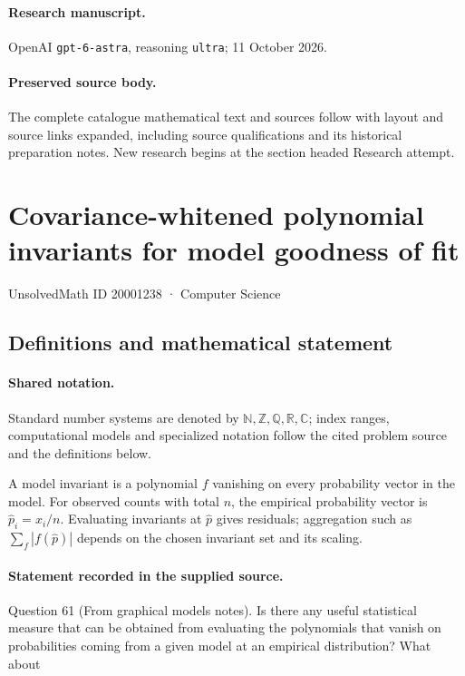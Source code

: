 \documentclass[11pt]{article}
\begin{document}
\paragraph{Research manuscript.} OpenAI \texttt{gpt-6-astra}, reasoning \texttt{ultra}; 11 October 2026.
\paragraph{Preserved source body.} The complete catalogue mathematical text and sources follow with layout and source links expanded, including source qualifications and its historical preparation notes. New research begins at the section headed Research attempt.

\section{Covariance-whitened polynomial invariants for model goodness of fit}\label{20001238}
{\small UnsolvedMath ID 20001238 · Computer Science}
\subsection{Definitions and mathematical statement}

\paragraph{Shared notation.}Standard number systems are denoted by $\mathbb N,\mathbb Z,\mathbb Q,\mathbb R,\mathbb C$; index ranges, computational models and specialized notation follow the cited problem source and the definitions below.


A model invariant is a polynomial $f$ vanishing on every probability vector in the model. For observed counts with total $n$, the empirical probability vector is $\widehat p_i=x_i/n$. Evaluating invariants at $\widehat p$ gives residuals; aggregation such as $\sum_f|f(\widehat p)|$ depends on the chosen invariant set and its scaling.
\paragraph{Statement recorded in the supplied source.}
Question 61 (From graphical models notes). Is there any useful statistical measure that can be obtained from evaluating the polynomials that vanish on probabilities coming from a given model at an empirical distribution? What about
\end{document}
